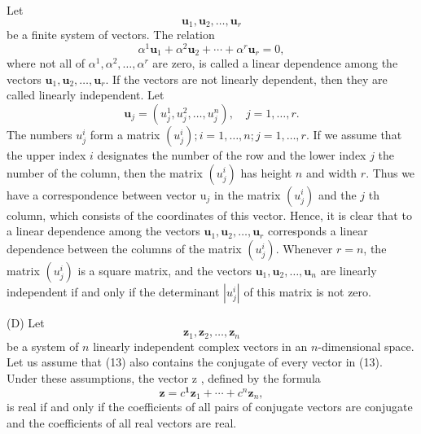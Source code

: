 \documentclass[10pt,a5paper]{book}
\theoremstyle{plain}
\theoremstyle{definition}
\theoremstyle{remark}
\begin{document}
Let
\[
\mathbf{u}_{1}, \mathbf{u}_{2}, \ldots, \mathbf{u}_{r}
\]
be a finite system of vectors. The relation
\[
\alpha^{1} \mathbf{u}_{1}+\alpha^{2} \mathbf{u}_{2}+\cdots+\alpha^{r} \mathbf{u}_{r}=0,
\]
where not all of $\alpha^{1}, \alpha^{2}, \ldots, \alpha^{r}$ are zero, is called a linear dependence among the vectors $\mathbf{u}_{1}, \mathbf{u}_{2}, \ldots, \mathbf{u}_{r}$. If the vectors are not linearly dependent, then they are called linearly independent. Let
\[
\mathbf{u}_{j}=\left(u_{j}^{1}, u_{j}^{2}, \ldots, u_{j}^{n}\right), \quad j=1, \ldots, r .
\]
The numbers $u_{j}^{i}$ form a matrix $\left(u_{j}^{i}\right) ; i=1, \ldots, n ; j=1, \ldots, r$. If we assume that the upper index $i$ designates the number of the row and the lower index $j$ the number of the column, then the matrix $\left(u_{j}^{i}\right)$ has height $n$ and width $r$. Thus we have a correspondence between vector $\mathrm{u}_{j}$ in the matrix $\left(u_{j}^{i}\right)$ and the $j$ th column, which consists of the coordinates of this vector. Hence, it is clear that to a linear dependence among the vectors $\mathbf{u}_{1}, \mathbf{u}_{2}, \ldots, \mathbf{u}_{r}$ corresponds a linear dependence between the columns of the matrix $\left(u_{j}^{i}\right)$. Whenever $r=n$, the matrix $\left(u_{j}^{i}\right)$ is a square matrix, and the vectors $\mathbf{u}_{1}, \mathbf{u}_{2}, \ldots, \mathbf{u}_{n}$ are linearly independent if and only if the determinant $\left|u_{j}^{i}\right|$ of this matrix is not zero.

(D) Let
\begin{equation*}
\mathbf{z}_{1}, \mathbf{z}_{2}, \ldots, \mathbf{z}_{n} \tag{13}
\end{equation*}
be a system of $n$ linearly independent complex vectors in an $n$-dimensional space. Let us assume that (13) also contains the conjugate of every vector in (13). Under these assumptions, the vector z , defined by the formula
\begin{equation*}
\mathbf{z}=c^{\mathbf{1}} \mathbf{z}_{1}+\cdots+c^{n} \mathbf{z}_{n}, \tag{14}
\end{equation*}
is real if and only if the coefficients of all pairs of conjugate vectors are conjugate and the coefficients of all real vectors are real.
\end{document}
